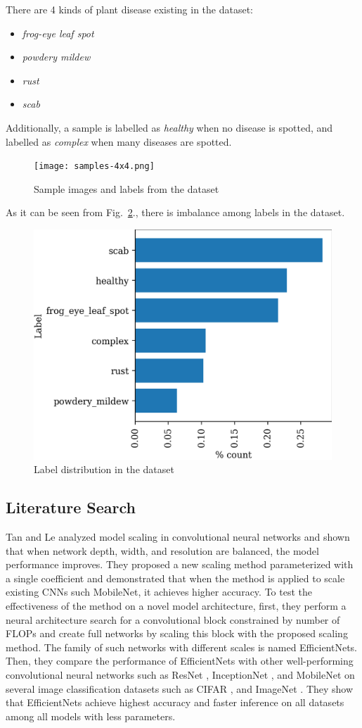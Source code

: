 \documentclass[conference]{IEEEtran}
\begin{document}
There are 4 kinds of plant disease existing in the dataset:
\begin{itemize}
\item \textit{frog-eye leaf spot}
\item \textit{powdery mildew}
\item \textit{rust}
\item \textit{scab}
\end{itemize}

Additionally, a sample is labelled as \textit{healthy} when no disease is spotted, 
and labelled as \textit{complex} when many diseases are spotted.

\begin{figure}
    \centerline{\texttt{[image: samples-4x4.png]}}
    \caption{Sample images and labels from the dataset}
    \label{fig:samples}
\end{figure}

As it can be seen from Fig.~\ref{fig:label-dist}., there is imbalance among labels in the dataset.

\begin{figure}
    \centerline{\includegraphics[width = 0.45 \textwidth]{label-dist-ratio.png}}
    \caption{Label distribution in the dataset}
    \label{fig:label-dist}
\end{figure}


\subsection{Literature Search}

Tan and Le \cite{EfficientNet} analyzed model scaling in convolutional neural networks 
and shown that when network depth, width, and resolution are balanced, the model performance
improves. They proposed a new scaling method parameterized with a single coefficient and
demonstrated that when the method is applied to scale existing CNNs such MobileNet, it 
achieves higher accuracy.
To test the effectiveness of the method on a novel model architecture, first, 
they perform a neural architecture search for a convolutional block constrained 
by number of FLOPs and create full networks by scaling this block with 
the proposed scaling method.
The family of such networks with different scales is named EfficientNets.
Then, they compare the performance of EfficientNets with other well-performing
convolutional neural networks such as 
ResNet \cite{ResNet2016}, 
InceptionNet \cite{InceptionNetV1} \cite{InceptionNetV3} \cite{InceptionNetV4}, 
and MobileNet \cite{MobileNet2017} 
on several image classification datasets such as 
CIFAR \cite{CIFAR}, and ImageNet \cite{ImageNet2014}. 
They show that EfficientNets achieve highest accuracy and faster inference on 
all datasets among all models with less parameters.
\end{document}
